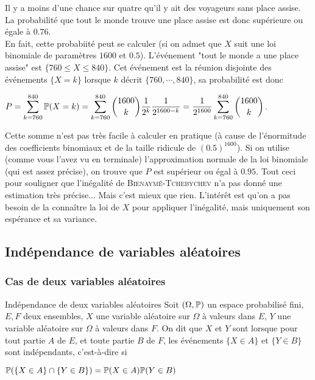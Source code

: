 \documentclass[12pt,a4paper]{report}
\begin{document}
\begin{exemple}{}
Il y a moins d'une chance sur quatre qu'il y ait des voyageurs sans place assise. La probabilité que tout le monde trouve une place assise est donc supérieure ou égale à $0.76$. \\
En fait, cette probabiité peut se calculer (si on admet que $X$ suit une loi binomiale de paramètres $1600$ et $0.5$). L'événement "tout le monde a une place assise" est $\{760 \le X \le 840\}$. Cet événement est la réunion disjointe des événements $\{X=k\}$ lorsque $k$ décrit $\{760,\cdots,840\}$, sa probabilité est donc 
\begin{center}
$P = \displaystyle \sum_{k=760}^{840} \mathbb{P}(X=k) = \sum_{k=760}^{840} \binom{1600}{k} \dfrac{1}{2^k}\dfrac{1}{2^{1600-k}} = \dfrac{1}{2^{1600}} \sum_{k=760}^{840} \binom{1600}{k}$.
\end{center}

Cette somme n'est pas très facile à calculer en pratique (à cause de l'énormitude des coefficients binomiaux et de la taille ridicule de $(0.5)^{1600}$). Si on utilise (comme vous l'avez vu en terminale) l'approximation normale de la loi binomiale (qui est assez précise), on trouve que $P$ est supérieur ou égal à $0.95$. Tout ceci pour souligner que l'inégalité de \textsc{Bienaymé-Tchebychev} n'a pas donné une estimation très précise... Mais c'est mieux que rien. L'intérêt est qu'on a pas besoin de la connaître la loi de $X$ pour appliquer l'inégalité, mais uniquement son espérance et sa variance.
\end{exemple}

\subsection{Indépendance de variables aléatoires}

\subsubsection{Cas de deux variables aléatoires}

\begin{definition}{Indépendance de deux variables aléatoires}{}
Soit $(\Omega, \mathbb{P})$ un espace probabilisé fini, $E,F$ deux ensembles, $X$ une variable aléatoire sur $\Omega$ à valeurs dans $E$, $Y$ une variable aléatoire sur $\Omega$ à valeurs dans $F$. On dit que $X$ et $Y$ sont  lorsque pour tout partie $A$ de $E$, et toute partie $B$ de $F$, les événements $\{X\in A\}$ et $\{Y \in B\}$ sont indépendants, c'est-à-dire si 
\begin{center}
$\mathbb{P}(\{X \in A\} \cap \{Y \in B\}) = \mathbb{P}(X \in A) \mathbb{P}(Y \in B)$
\end{center}
\end{definition}
\end{document}
